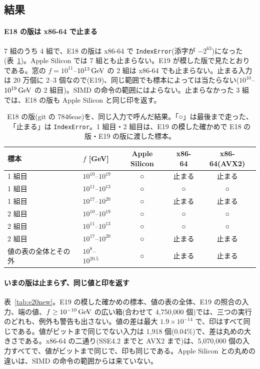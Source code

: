 \subsection{結果}

\paragraph{E18 の版は x86-64 で止まる}
7 組のうち 4 組で、E18 の版は x86-64 で \texttt{IndexError}(添字が $-2^{63}$)になった(表~\ref{tab:e20old})。Apple Silicon では 7 組とも止まらない。E19 が模した版で見たとおりである。窓の $f=10^{11}$--$10^{13}\,\mathrm{GeV}$ の 2 組は x86-64 でも止まらない。止まる入力は 20 万個に 2--3 個なので(E19)、同じ範囲でも標本によっては当たらない($10^{10}$--$10^{19}\,\mathrm{GeV}$ の 2 組目)。SIMD の命令の範囲にはよらない。止まらなかった 3 組では、E18 の版も Apple Silicon と同じ印を返す。

\begin{table}[H]
\centering\small
\begin{tabular}{llccc}
\toprule
標本 & $f$ [GeV] & Apple Silicon & x86-64 & x86-64(AVX2)\\
\midrule
1 組目 & $10^{10}$--$10^{19}$ & ○ & 止まる & 止まる\\
1 組目 & $10^{11}$--$10^{13}$ & ○ & ○ & ○\\
1 組目 & $10^{17}$--$10^{20}$ & ○ & 止まる & 止まる\\
2 組目 & $10^{10}$--$10^{19}$ & ○ & ○ & ○\\
2 組目 & $10^{11}$--$10^{13}$ & ○ & ○ & ○\\
2 組目 & $10^{17}$--$10^{20}$ & ○ & 止まる & 止まる\\
値の表の全体とその外 & $10^{8}$--$10^{20.5}$ & ○ & 止まる & 止まる\\
\bottomrule
\end{tabular}
\caption{E18 の版(git の 7846eae)を、同じ入力で呼んだ結果。「○」は最後まで走った、「止まる」は \texttt{IndexError}。1 組目・2 組目は、E19 の模した確かめで E18 の版・E19 の版に渡した標本。}
\label{tab:e20old}
\end{table}

\paragraph{いまの版は止まらず、同じ値と印を返す}
表~\ref{tab:e20new}。E19 の模した確かめの標本、値の表の全体、E19 の照合の入力、端の値、$f\ge10^{-10}\,\mathrm{GeV}$ の広い箱(合わせて 4{,}750{,}000 個)では、三つの実行のどれも、例外も警告も出さない。値の差は最大 $1.9\times10^{-14}$ で、印はすべて同じである。値がビットまで同じでない入力は 1{,}918 個(0.04\%)で、差は丸めの大きさである。x86-64 の二通り(SSE4.2 までと AVX2 まで)は、5{,}070{,}000 個の入力すべてで、値がビットまで同じで、印も同じである。Apple Silicon との丸めの違いは、SIMD の命令の範囲からは来ていない。

